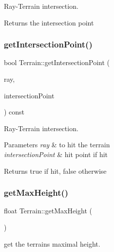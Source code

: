 Ray-\/\+Terrain intersection. \begin{DoxyReturn}{Returns}
the intersection point 
\end{DoxyReturn}
\mbox{\label{classTerrain_a1455fb66bddeae92b522ce4523ed42f7}} 
\subsubsection{\texorpdfstring{get\+Intersection\+Point()}{getIntersectionPoint()}\hspace{0.1cm}{\footnotesize\ttfamily [4/4]}}
{\footnotesize\ttfamily bool Terrain\+::get\+Intersection\+Point (\begin{DoxyParamCaption}\item[{const \hyperlink{classRay}{Ray} \&}]{ray,  }\item[{\hyperlink{classVec3}{Vec3} \&}]{intersection\+Point }\end{DoxyParamCaption}) const}

Ray-\/\+Terrain intersection. 
\begin{DoxyParams}{Parameters}
{\em ray} & to hit the terrain \\
\hline
{\em intersection\+Point} & hit point if hit \\
\hline
\end{DoxyParams}
\begin{DoxyReturn}{Returns}
true if hit, false otherwise 
\end{DoxyReturn}
\mbox{\label{classTerrain_a8a6f2132b654da2719044dc083297c0a}} 
\subsubsection{\texorpdfstring{get\+Max\+Height()}{getMaxHeight()}\hspace{0.1cm}{\footnotesize\ttfamily [1/2]}}
{\footnotesize\ttfamily float Terrain\+::get\+Max\+Height (\begin{DoxyParamCaption}{ }\end{DoxyParamCaption})}

get the terrain\textquotesingle{}s maximal height. \mbox{\label{classTerrain_a8a6f2132b654da2719044dc083297c0a}} 
